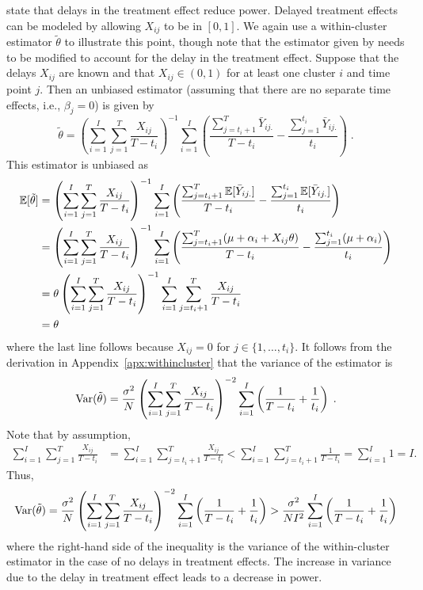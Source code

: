 \documentclass[10pt]{article}
\begin{document}
\textcite{Hussey:2007} state that delays in the treatment effect reduce power. Delayed treatment effects can be modeled by allowing $X_{ij}$ to be in $[0,1]$. We again use a within-cluster estimator $\tilde{\theta}$ to illustrate this point, though note that the estimator given by \citeauthor{Hussey:2007} needs to be modified to account for the delay in the treatment effect. Suppose that the delays $X_{ij}$ are known and that $X_{ij}\in(0,1)$ for at least one cluster $i$ and time point $j$. Then an unbiased estimator (assuming that there are no separate time effects, i.e., $\beta_j=0$) is given by
\[
\tilde{\theta} = \left(\sum_{i=1}^I\sum_{j=1}^T\frac{X_{ij}}{T-t_i}\right)^{-1}\sum_{i=1}^I\left(\frac{\sum_{j=t_i+1}^T\bar{Y}_{ij.}}{T-t_i} - \frac{\sum_{j=1}^{t_i}\bar{Y}_{ij.}}{t_i}\right)\;.
\]
This estimator is unbiased as
\begin{align*}
\mathbb{E}[\tilde{\theta}] &= \left(\sum_{i=1}^I\sum_{j=1}^T\frac{X_{ij}}{T-t_i}\right)^{-1}\sum_{i=1}^I\left(\frac{\sum_{j=t_i+1}^T\mathbb{E}[\bar{Y}_{ij.}]}{T-t_i} - \frac{\sum_{j=1}^{t_i}\mathbb{E}[\bar{Y}_{ij.}]}{t_i}\right) \\
&= \left(\sum_{i=1}^I\sum_{j=1}^T\frac{X_{ij}}{T-t_i}\right)^{-1}\sum_{i=1}^I\left(\frac{\sum_{j=t_i+1}^T(\mu+\alpha_i+X_{ij}\theta)}{T-t_i} - \frac{\sum_{j=1}^{t_i}(\mu+\alpha_i)}{t_i}\right) \\
&= \theta\left(\sum_{i=1}^I\sum_{j=1}^T\frac{X_{ij}}{T-t_i}\right)^{-1}\sum_{i=1}^I\sum_{j=t_i+1}^T\frac{X_{ij}}{T-t_i} \\
&= \theta
\end{align*}
where the last line follows because $X_{ij}=0$ for $j\in\{1,\ldots,t_i\}$. It follows from the derivation in Appendix~\ref{apx:withincluster} that the variance of the estimator is
\[
\mathrm{Var}(\tilde{\theta}) = \frac{\sigma^2}{N}\left(\sum_{i=1}^I\sum_{j=1}^T\frac{X_{ij}}{T-t_i}\right)^{-2}\sum_{i=1}^I\left(\frac{1}{T-t_i} + \frac{1}{t_i}\right) \;.
\]
Note that by assumption,
\begin{align*}
\sum_{i=1}^I\sum_{j=1}^T\frac{X_{ij}}{T-t_i} &= \sum_{i=1}^I\sum_{j=t_i+1}^T\frac{X_{ij}}{T-t_i} < \sum_{i=1}^I\sum_{j=t_i+1}^T\frac{1}{T-t_i} = \sum_{i=1}^I1 = I.
\end{align*}
Thus,
\[
\mathrm{Var}(\tilde{\theta}) = \frac{\sigma^2}{N}\left(\sum_{i=1}^I\sum_{j=1}^T\frac{X_{ij}}{T-t_i}\right)^{-2}\sum_{i=1}^I\left(\frac{1}{T-t_i} + \frac{1}{t_i}\right) > \frac{\sigma^2}{NI^2}\sum_{i=1}^I\left(\frac{1}{T-t_i} + \frac{1}{t_i}\right)
\]
where the right-hand side of the inequality is the variance of the within-cluster estimator in the case of no delays in treatment effects. The increase in variance due to the delay in treatment effect leads to a decrease in power.
\end{document}
